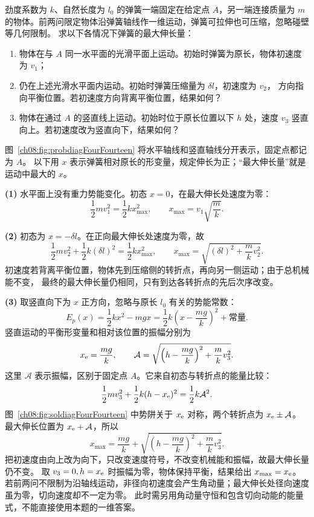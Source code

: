 {
\begin{origexamplebox}{}\label{ch08:ex:s11-4-14}
劲度系数为 $k$、自然长度为 $l_0$ 的弹簧一端固定在给定点 $A$，另一端连接质量为
$m$ 的物体。前两问限定物体沿弹簧轴线作一维运动，弹簧可拉伸也可压缩，忽略碰壁等几何限制。
求以下各情况下弹簧的最大伸长量：
\begin{enumerate}[label=\arabic*.,leftmargin=2.2em]
 \item 物体在与 $A$ 同一水平面的光滑平面上运动。初始时弹簧为原长，物体初速度为
 $v_1$；
 \item 仍在上述光滑水平面内运动。初始时弹簧压缩量为 $\delta l$，初速度为 $v_2$，
 方向指向平衡位置。若初速度方向背离平衡位置，结果如何？
 \item 物体在通过 $A$ 的竖直线上运动。初始时位于原长位置以下 $h$ 处，速度 $v_3$
 竖直向上。若初速度改为竖直向下，结果如何？
\end{enumerate}
\probdiagFourFourteen
\end{origexamplebox}

\begin{xesolution}
图~\ref{ch08:fig:probdiagFourFourteen} 将水平轴线和竖直轴线分开表示，固定点都记为 $A$。
以下用 $x$ 表示弹簧相对原长的形变量，规定伸长为正；“最大伸长量”就是运动中最大的
$x$。

\textbf{(1)} 水平面上没有重力势能变化。初态 $x=0$，在最大伸长处速度为零：
\[
\frac12mv_1^2=\frac12kx_{\max}^2,
\qquad
\boxed{x_{\max}=v_1\sqrt{\frac{m}{k}}}.
\]

\textbf{(2)} 初态为 $x=-\delta l$。在正向最大伸长处速度为零，故
\[
\frac12mv_2^2+\frac12k(\delta l)^2
=\frac12kx_{\max}^2,
\qquad
\boxed{
 x_{\max}=\sqrt{(\delta l)^2+\frac{m}{k}v_2^2}}.
\]
初速度若背离平衡位置，物体先到压缩侧的转折点，再向另一侧运动；由于总机械能不变，
最终的最大伸长量仍相同，只有到达各转折点的先后次序改变。

\textbf{(3)} 取竖直向下为 $x$ 正方向，忽略与原长 $l_0$ 有关的势能常数：
\[
E_p(x)=\frac12kx^2-mgx
=\frac12k\left(x-\frac{mg}{k}\right)^2+\text{常量}.
\]
竖直运动的平衡形变量和相对该位置的振幅分别为
\[
x_{\rm e}=\frac{mg}{k},
\qquad
\mathcal A=\sqrt{\left(h-\frac{mg}{k}\right)^2+\frac{m}{k}v_3^2}.
\]
\soldiagFourFourteen
这里 $\mathcal A$ 表示振幅，区别于固定点 $A$。它来自初态与转折点的能量比较：
\[
 \frac12mv_3^2+\frac12k(h-x_{\rm e})^2=\frac12k\mathcal A^2.
\]
图~\ref{ch08:fig:soldiagFourFourteen} 中势阱关于 $x_{\rm e}$ 对称，两个转折点为 $x_{\rm e}\pm\mathcal A$。
最大伸长位置为 $x_{\rm e}+\mathcal A$，所以
\[
\boxed{
 x_{\max}=\frac{mg}{k}
 +\sqrt{\left(h-\frac{mg}{k}\right)^2+\frac{m}{k}v_3^2}}.
\]
把初速度由向上改为向下，只改变速度符号，不改变机械能和振幅，故最大伸长量仍不变。
取 $v_3=0,h=x_{\rm e}$ 时振幅为零，物体保持平衡，结果给出 $x_{\max}=x_{\rm e}$。
若前两问不限制为沿轴线运动，非径向初速度会产生角动量；最大伸长处径向速度虽为零，切向速度却不一定为零。
此时需另用角动量守恒和包含切向动能的能量式，不能直接使用本题的一维答案。
\end{xesolution}

}
